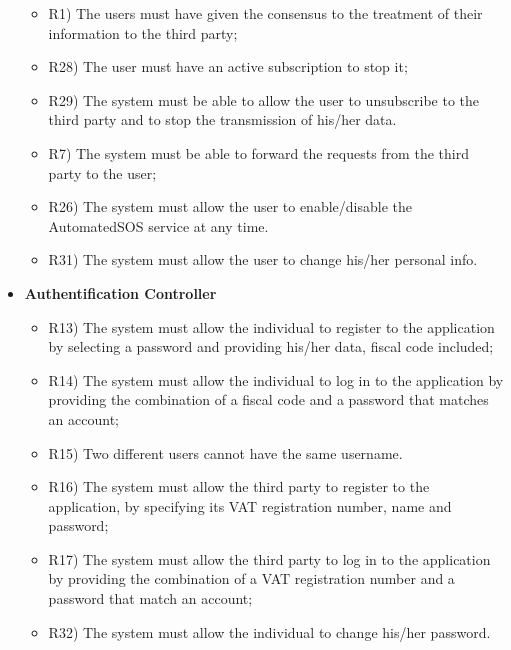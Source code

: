 \begin{itemize}
		\begin{itemize}
			\item R1) The users must have given the consensus to the treatment of their information to the third party;\\
			\item R28) The user must have an active subscription to stop it;\\
	 		\item R29) The system must be able to allow the user to unsubscribe to the third party and to stop the transmission of his/her data.\\
	 		\item R7) The system must be able to forward the requests from the third party to the user;\\
	 		\item R26) The system must allow the user to enable/disable the AutomatedSOS service at any time.\\
			\item R31) The system must allow the user to change his/her personal info.\\
		\end{itemize}
		\item \textbf{Authentification Controller}
		\begin{itemize}
			\item R13) The system must allow the individual to register to the application by selecting a password and providing his/her data, fiscal code included;\\
			\item R14) The system must allow the individual to log in to the application by providing the combination of a fiscal code and a password that matches an account;\\
			\item R15) Two different users cannot have the same username.\\
			\item R16) The system must allow the third party to register to the application, by specifying its VAT registration number, name and password;\\
			\item R17) The system must allow the third party to log in to the application by providing the combination of a VAT registration number and a password that match an account;\\
			\item R32) The system must allow the individual to change his/her password.\\

\end{itemize}
\end{itemize}
